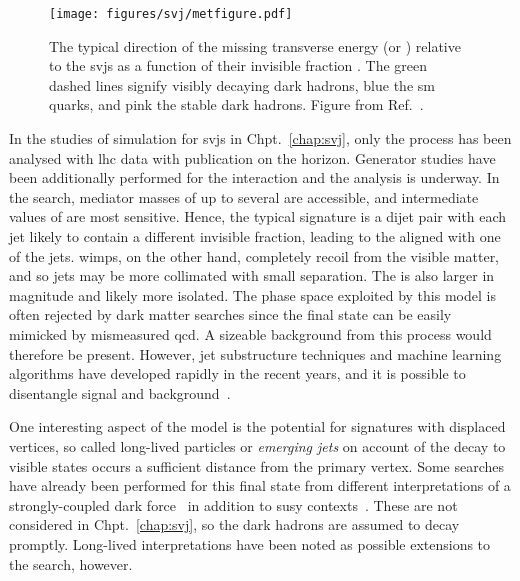 \begin{figure}[htbp]
    \centering
    \texttt{[image: figures/svj/metfigure.pdf]}
    \caption[The typical direction of the missing transverse energy relative to the semi-visible jets as a function of the invisible fraction \rinv]{The typical direction of the missing transverse energy \ETslash\xspace (or \ptvecmiss) relative to the \glspl{svj} as a function of their invisible fraction \rinv. The green dashed lines signify visibly decaying dark hadrons, blue the \acrshort{sm} quarks, and pink the stable dark hadrons. Figure from Ref.~.}
    \label{fig:theory_svj_met_dir}
\end{figure}

In the studies of simulation for \glspl{svj} in Chpt.~\ref{chap:svj}, only the \schannel process has been analysed with \acrshort{lhc} data with publication on the horizon. Generator studies have been additionally performed for the \tchannel interaction and the analysis is underway. In the \schannel search, mediator masses of up to several \TeVns are accessible, and intermediate values of \rinv are most sensitive. Hence, the typical signature is a dijet pair with each \gls{jet} likely to contain a different invisible fraction, leading to the \ptvecmiss aligned with one of the \glspl{jet}. \glspl{wimp}, on the other hand, completely recoil from the visible matter, and so \glspl{jet} may be more collimated with small separation. The \ptvecmiss is also larger in magnitude and likely more isolated. The phase space exploited by this model is often rejected by dark matter searches since the final state can be easily mimicked by mismeasured \acrshort{qcd}. A sizeable background from this process would therefore be present. However, \gls{jet} substructure techniques and machine learning algorithms have developed rapidly in the recent years, and it is possible to disentangle signal and background~\cite{GiorgiaRaucoThesis}.

One interesting aspect of the model is the potential for signatures with displaced vertices, so called long-lived particles or \emph{emerging jets} on account of the decay to visible states occurs a sufficient distance from the primary vertex. Some searches have already been performed for this final state from different interpretations of a strongly-coupled dark force~\cite{Sirunyan:2018njd} in addition to \acrlong{susy} contexts~\cite{SUS16038published}. These are not considered in Chpt.~\ref{chap:svj}, so the dark hadrons are assumed to decay promptly. Long-lived interpretations have been noted as possible extensions to the search, however.
